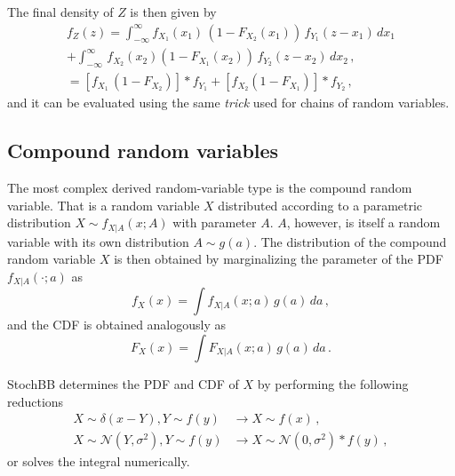 The final density of $Z$ is then given by
\begin{multline}
 f_Z(z) = \int_{-\infty}^\infty f_{X_1}(x_1)\,\left(1-F_{X_2}(x_1)\right)\,f_{Y_1}(z-x_1)\,dx_1\nonumber \\
  + \int_{-\infty}^\infty \,f_{X_2}(x_2)\left(1-F_{X_1}(x_2)\right)\,f_{Y_2}(z-x_2)\,dx_2\,, \nonumber \\
  = \left[f_{X_1}\,\left(1-F_{X_2}\right)\right]\ast f_{Y_1} 
       + \left[f_{X_2}\left(1-F_{X_1}\right)\right]\ast f_{Y_2}\,,\nonumber
\end{multline}
and it can be evaluated using the same \emph{trick} used for chains of random variables.

\subsection{Compound random variables}
The most complex derived random-variable type is the compound random variable. That is a random variable
$X$ distributed according to a parametric distribution $X\sim f_{X|A}(x;A)$ with parameter $A$. $A$, however, 
is itself a random variable with its own distribution $A\sim g(a)$. The distribution of the compound 
random variable $X$ is then obtained by marginalizing the parameter of the PDF $f_{X|A}(\cdot;a)$ as 
\begin{equation}
 f_X(x) = \int f_{X|A}(x;a)\,g(a)\,da\,,\nonumber
\end{equation}
and the CDF is obtained analogously as
\begin{equation}
 F_X(x) = \int F_{X|A}(x;a)\,g(a)\,da\,.\nonumber
\end{equation}

StochBB determines the PDF and CDF of $X$ by performing the following reductions
\begin{align}
 X\sim\delta(x-Y), Y\sim f(y) &\longrightarrow X \sim f(x)\,, \nonumber \\
 X\sim\mathcal{N}(Y,\sigma^2), Y\sim f(y) &\longrightarrow X \sim \mathcal{N}(0, \sigma^2) \ast f(y)\,, \nonumber
\end{align}
or solves the integral numerically.

